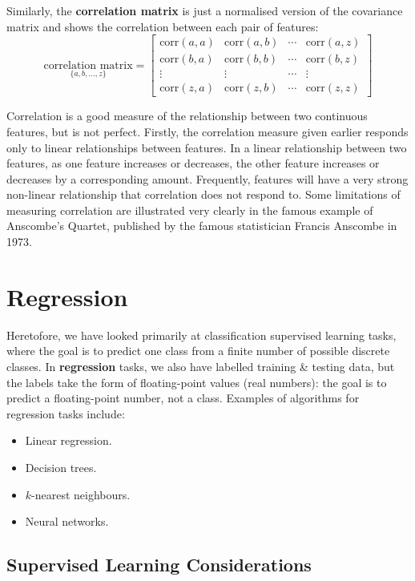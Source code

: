 \documentclass[a4paper,11pt]{article}
\begin{document}
Similarly, the \textbf{correlation matrix} is just a normalised version of the covariance matrix and shows the correlation between each pair of features:
\[
    \underset{\{ a,b,\dots,z \}}{\text{correlation matrix}} =
    \begin{bmatrix}
        \text{corr}(a,a) & \text{corr}(a,b) & \cdots & \text{corr}(a,z) \\
        \text{corr}(b,a) & \text{corr}(b,b) & \cdots & \text{corr}(b,z) \\
        \vdots & \vdots & \cdots & \vdots \\
        \text{corr}(z,a) & \text{corr}(z,b) & \cdots & \text{corr}(z,z)
    \end{bmatrix}
\]

Correlation is a good measure of the relationship between two continuous features, but is not perfect.
Firstly, the correlation measure given earlier responds only to linear relationships between features.
In a linear relationship between two features, as one feature increases or decreases, the other feature increases or decreases by a corresponding amount.
Frequently, features will have a very strong non-linear relationship that correlation does not respond to.
Some limitations of measuring correlation are illustrated very clearly in the famous example of Anscombe's Quartet, published by the famous statistician Francis Anscombe in 1973.

\section{Regression}
Heretofore, we have looked primarily at classification supervised learning tasks, where the goal is to predict one class from a finite number of possible discrete classes.
In \textbf{regression} tasks, we also have labelled training \& testing data, but the labels take the form of floating-point values (real numbers): the goal is to predict a floating-point  number, not a class.
Examples of algorithms for regression tasks include:
\begin{itemize}
    \item   Linear regression.
    \item   Decision trees.
    \item   $k$-nearest neighbours.
    \item   Neural networks.
\end{itemize}

\subsection{Supervised Learning Considerations}
\end{document}
